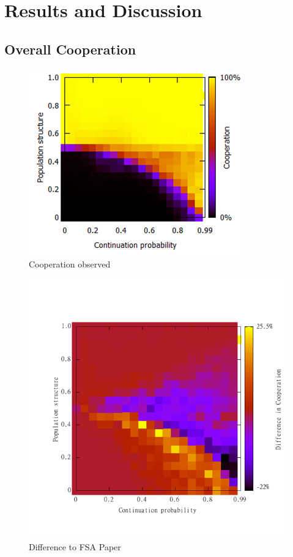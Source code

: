 \documentclass[a4paper,11pt,bcshonoursthesis,singlespace,twoside,thesisdraft,pdflatex]{cssethesis}
\begin{document}
\chapter{Results and Discussion}
\section{Overall Cooperation}
\begin{figure}[h]
\centering
\includegraphics{cooperationOverall}
\caption{Cooperation observed}
\label{fig:cooperation}
\end{figure}

\begin{figure}[h]
\centering
\includegraphics{cooperation}
\caption{Difference to FSA Paper}
\label{fig:difference}
\end{figure}
\end{document}
